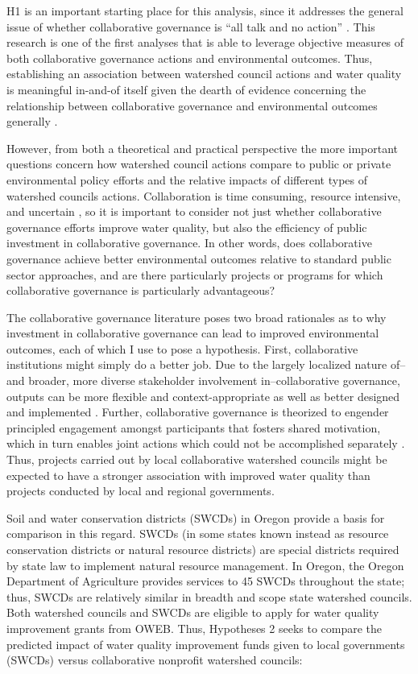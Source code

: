\documentclass[12pt,a4paper,titlepage]{article}
\begin{document}
H1 is an important starting place for this analysis, since it addresses the general issue of whether collaborative governance is “all talk and no action” \parencite{lubell2004}. This research is one of the first analyses that is able to leverage objective measures of both collaborative governance actions and environmental outcomes. Thus, establishing an association between watershed council actions and water quality is meaningful in-and-of itself given the dearth of evidence concerning the relationship between collaborative governance and environmental outcomes generally \parencite{carr2012,koontz2006, newig2009}.

However, from both a theoretical and practical perspective the more important questions concern how watershed council actions compare to public or private environmental policy efforts and the relative impacts of different types of watershed councils actions. Collaboration is time consuming, resource intensive, and uncertain \parencite{margerum2011}, so it is important to consider not just whether collaborative governance efforts improve water quality, but also the efficiency of public investment in collaborative governance. In other words, does collaborative governance achieve better environmental outcomes relative to standard public sector approaches, and are there particularly projects or programs for which collaborative governance is particularly advantageous?

The collaborative governance literature poses two broad rationales as to why investment in collaborative governance can lead to improved environmental outcomes, each of which I use to pose a hypothesis. First, collaborative institutions might simply do a better job. Due to the largely localized nature of--and broader, more diverse stakeholder involvement in--collaborative governance, outputs can be more flexible and context-appropriate \parencite{nikolic2008} as well as better designed and implemented \parencite{sabatier2005}. Further, collaborative governance is theorized to engender principled engagement amongst participants that fosters shared motivation, which in turn enables joint actions which could not be accomplished separately \parencite{emerson2012}. Thus, projects carried out by local collaborative watershed councils might be expected to have a stronger association with improved water quality than projects conducted by local and regional governments.

Soil and water conservation districts (SWCDs) in Oregon provide a basis for comparison in this regard. SWCDs (in some states known instead as resource conservation districts or natural resource districts) are special districts required by state law to implement natural resource management. In Oregon, the Oregon Department of Agriculture provides services to 45 SWCDs throughout the state; thus, SWCDs are relatively similar in breadth and scope state watershed councils. Both watershed councils and SWCDs are eligible to apply for water quality improvement grants from OWEB. Thus, Hypotheses 2 seeks to compare the predicted impact of water quality improvement funds given to local governments (SWCDs) versus collaborative nonprofit watershed councils:
\end{document}
